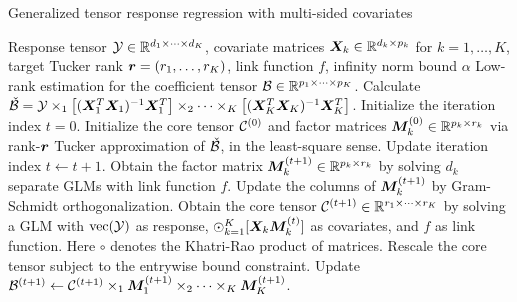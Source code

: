 \documentclass{article}
\begin{document}
\begin{algorithm}[t]
\caption{Generalized tensor response regression with multi-sided covariates}\label{alg:B}
\begin{algorithmic}[1]
\INPUT Response tensor $\mathcal{Y}\in \mathbb{R}^{d_1\times \cdots \times d_K}$, covariate matrices $\bm X_k\in\mathbb{R}^{d_k\times p_k}$ for $k=1,\ldots,K$, target Tucker rank $\bm{r}=(r_1,\ldots,r_K)$, link function $f$, infinity norm bound $\alpha$
\OUTPUT Low-rank estimation for the coefficient tensor $\mathcal{B}\in\mathbb{R}^{p_1\times \cdots\times p_K}$. 
\State Calculate $\check {\mathcal{B}}=\mathcal{Y}\times_1 \left[(\bm X_1^T\bm X_1)^{-1}\bm X^T_1\right] \times_2\cdots\times_K\left[(\bm X_K^T\bm X_K)^{-1}\bm X^T_K\right] $.
\State Initialize the iteration index $t=0$. Initialize the core tensor $\mathcal{C}^{(0)}$ and factor matrices $\bm M^{(0)}_k\in\mathbb{R}^{p_k\times r_k}$ via rank-$\bm{r}$ Tucker approximation of $\check{\mathcal{B}}$, in the least-square sense. 
\State Update iteration index $t \leftarrow t+1$.
\State Obtain the factor matrix $\bm M_k^{(t+1)}\in\mathbb{R}^{p_k\times r_k}$ by solving $d_k$ separate GLMs with link function $f$. 
\State Update the columns of $\bm M_k^{(t+1)}$ by Gram-Schmidt orthogonalization.
\EndFor
\State Obtain the core tensor $\mathcal{C}^{(t+1)}\in\mathbb{R}^{r_1\times\cdots\times r_K}$ by solving a GLM with $\text{vec}(\mathcal{Y})$ as response, $\odot_{k=1}^K[ \bm X_k\bm M^{(t)}_k]$ as covariates, and $f$ as link function. Here $\circ$ denotes the Khatri-Rao product of matrices. 
\State Rescale the core tensor subject to the entrywise bound constraint. 
\State Update $\mathcal{B}^{(t+1)}\leftarrow \mathcal{C}^{(t+1)}\times_1\bm M_1^{(t+1)}\times_2\cdots\times_K\bm M_K^{(t+1)}$.
\EndWhile
\end{algorithmic}
\end{algorithm}
\end{document}
